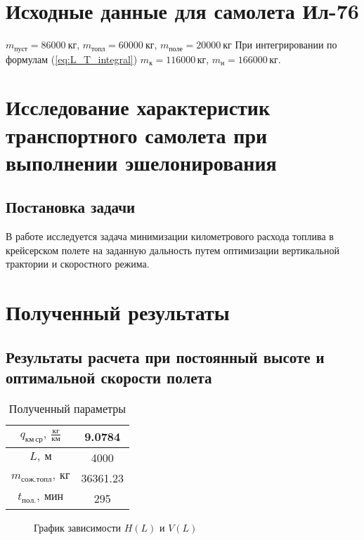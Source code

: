 \documentclass[bachelor,subf,14pt, substylefile = spbu.rtx]{disser}
\begin{document}
\section{Исходные данные для самолета Ил-76}
$m_{пуст} = 86000\ \text{кг}$, $m_{топл}= 60000\ \text{кг}$, $m_{поле}=20000\ \text{кг}$
При интегрировании по формулам (\ref{eq:L_T_integral}) $m_{к}=116000\, кг$, $m_{н}=166000\, кг$.

\section{Исследование характеристик транспортного самолета при выполнении эшелонирования}
\subsection{Постановка задачи}
В работе исследуется задача минимизации километрового расхода топлива в крейсерском полете на заданную дальность путем оптимизации вертикальной трактории и скоростного режима.  


%

\section{Полученный результаты}
\subsection{Результаты расчета при постоянный высоте и оптимальной скорости полета}

\begin{table}[H]
    \centering
    \caption{Полученный параметры}
    \label{tab:table_H_const_V_diff}
    \begin{tabular}{|c|c|}
        \hline
        $q_{км\, ср},\ \frac{кг}{км}$ & 9.0784 \\
        \hline
        $L,\ м$ & 4000 \\
        \hline
        $m_{сож.топл},\ кг$ & 36361.23 \\
        \hline
        $t_{пол.},\ мин$ & 295 \\
        \hline
    \end{tabular}
\end{table}



\begin{figure}[H]
\centering

\caption{График зависимости $H(L)$ и $V(L)$}
\label{fig:H_const_V_diff_L_H_V}
\end{figure}
\end{document}
